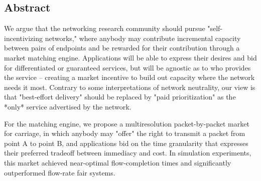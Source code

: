 \subsection*{Abstract}
We argue that the networking research community should pursue "self-incentivizing networks," where anybody may contribute incremental capacity between pairs of endpoints and be rewarded for their contribution through a market matching engine.
Applications will be able to express their desires and bid for differentiated or guaranteed services, but will be agnostic as to who provides the service -- creating a market incentive to build out capacity where the network needs it most.
Contrary to some interpretations of network neutrality, our view is that "best-effort delivery" should be replaced by "paid prioritization" as the *only* service advertised by the network.

For the matching engine, we propose a multiresolution packet-by-packet market for carriage, in which anybody may "offer" the right to transmit a packet from point A to point B, and applications bid on the time granularity that expresses their preferred tradeoff between immediacy and cost.
In simulation experiments, this market achieved near-optimal flow-completion times and significantly outperformed flow-rate fair systems.


